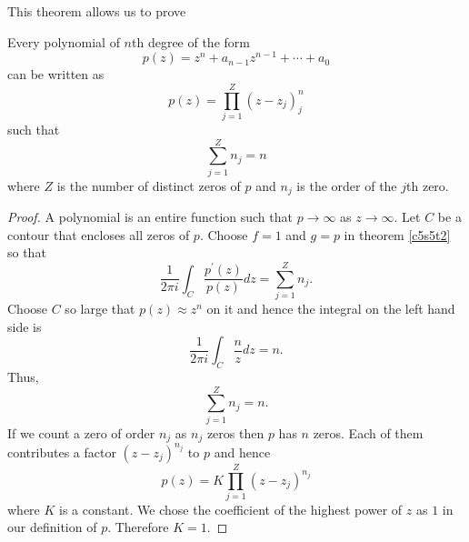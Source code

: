 This theorem allows us to prove
\begin{thm}\label{c5s5t3}
Every polynomial of $n$th degree of the form
\[
p(z) = z^n + a_{n-1}z^{n-1} + \cdots + a_0
\]
can be written as
\[
p(z) = \prod_{j=1}^Z(z - z_j)^n_j
\]
such that
\[
\sum_{j=1}^Z n_j = n
\]
where $Z$ is the number of distinct zeros of $p$ and $n_j$ is the order of the
$j$th zero.
\end{thm}
\begin{proof}
A polynomial is an entire function such that $p \rightarrow \infty$ as $z
\rightarrow \infty$. Let $C$ be a contour that encloses all zeros of $p$.
Choose $f = 1$ and $g = p$ in theorem \ref{c5s5t2} so that
\[
\frac{1}{2\pi i}\int_C \frac{p^\prime(z)}{p(z)}dz = \sum_{j=1}^Z n_j.
\]
Choose $C$ so large that $p(z) \approx z^n$ on it and hence the integral on
the left hand side is
\[
\frac{1}{2\pi i}\int_C \frac{n}{z}dz = n.
\]
Thus,
\[
\sum_{j=1}^Z n_j = n.
\]
If we count a zero of order $n_j$ as $n_j$ zeros then $p$ has $n$ zeros. Each
of them contributes a factor $(z - z_j)^{n_j}$ to $p$ and hence
\[
p(z) = K\prod_{j=1}^Z(z - z_j)^{n_j}
\]
where $K$ is a constant. We chose the coefficient of the highest power of $z$
as $1$ in our definition of $p$. Therefore $K = 1$.
\end{proof}

